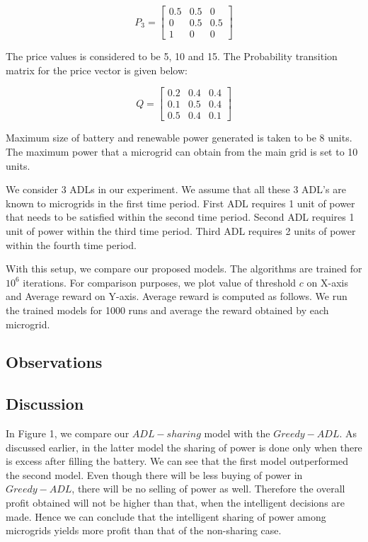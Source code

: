 \[
P_{3}=
\begin{bmatrix}
0.5 & 0.5 & 0 \\
0 & 0.5 & 0.5 \\
1 & 0 & 0
\end{bmatrix}
\]




The price values is considered to be 5, 10 and 15. The Probability transition matrix for the price vector is given below:



\[
Q=
\begin{bmatrix}
0.2 & 0.4 & 0.4 \\
0.1 & 0.5 & 0.4 \\
0.5 & 0.4 & 0.1
\end{bmatrix}
\]


Maximum size of battery and renewable power generated is taken to be 8 units. The maximum power that a microgrid can obtain from the main grid is set to 10 units.

We consider 3 ADLs in our experiment. We assume that all these 3 ADL's are known to microgrids in the first time period. First ADL requires 1 unit of power that needs to be satisfied within the second time period. Second ADL requires 1 unit of power within the third time period. Third ADL requires 2 units of power within the fourth time period.

With this setup, we compare our proposed models. The algorithms are trained for $10^6$ iterations. For comparison purposes, we plot value of threshold $c$ on X-axis and Average reward on Y-axis. Average reward is computed as follows. We run the trained models for 1000 runs and average the reward obtained by each microgrid. 

\subsection{Observations}

\subsection{Discussion}

In Figure 1, we compare our $ADL-sharing$ model with the $Greedy- ADL$. As discussed earlier, in the latter model the sharing of power is done only when there is excess after filling the battery. We can see that the first model outperformed the second model. Even though there will be less buying of power in $Greedy-ADL$, there will be no selling of power as well. Therefore  the overall profit obtained will not be higher than that, when the intelligent decisions are made. Hence we can conclude that the intelligent sharing of power among microgrids yields more profit than that of the non-sharing case. 

